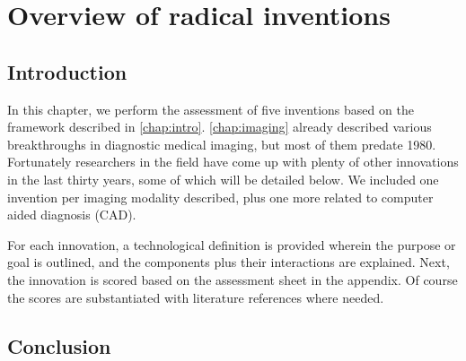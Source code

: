 \chapter{Overview of radical inventions}\label{chap:inventions}

\section{Introduction} %
In this chapter, we perform the assessment of five inventions based on the
framework described in \autoref{chap:intro}. \autoref{chap:imaging} already
described various breakthroughs in diagnostic medical imaging, but most of them
predate 1980. Fortunately researchers in the field have come up with plenty of
other innovations in the last thirty years, some of which will be detailed
below. We included one invention per imaging modality described, plus one more
related to computer aided diagnosis (CAD).

For each innovation, a technological definition is provided wherein the purpose
or goal is outlined, and the components plus their interactions are explained.
Next, the innovation is scored based on the assessment sheet in the appendix. Of
course the scores are substantiated with literature references where needed.











\section{Conclusion}
